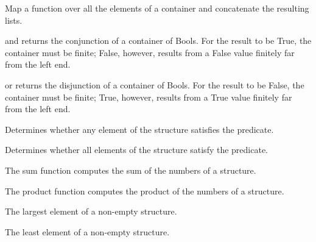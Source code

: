 Map a function over all the elements of a container and concatenate the resulting lists.

and returns the conjunction of a container of Bools. For the result to be True, the container must be finite; False, however, results from a False value finitely far from the left end.

or returns the disjunction of a container of Bools. For the result to be False, the container must be finite; True, however, results from a True value finitely far from the left end.

Determines whether any element of the structure satisfies the predicate.

Determines whether all elements of the structure satisfy the predicate.

The sum function computes the sum of the numbers of a structure.

The product function computes the product of the numbers of a structure.

The largest element of a non-empty structure.

The least element of a non-empty structure.